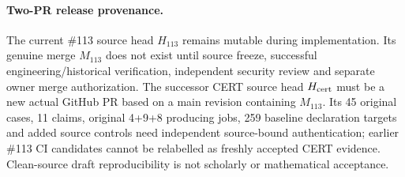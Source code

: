\paragraph{Two-PR release provenance.}
The current \#113 source head $H_{113}$ remains mutable during implementation.
Its genuine merge $M_{113}$ does not exist until source freeze, successful
engineering/historical verification, independent security review and separate
owner merge authorization. The successor CERT source head $H_{\rm cert}$ must
be a new actual GitHub PR based on a main revision containing $M_{113}$.
Its 45 original cases, 11 claims, original 4+9+8 producing jobs, 259
baseline declaration targets and added source controls need independent
source-bound authentication; earlier \#113 CI candidates cannot be
relabelled as freshly accepted CERT evidence. Clean-source draft
reproducibility is not scholarly or mathematical acceptance.
